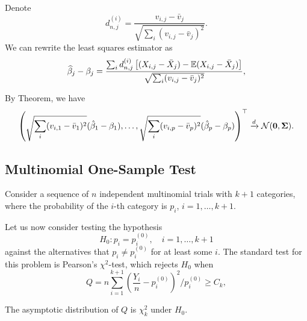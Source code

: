 Denote
\begin{equation*}
	d_{n,j}^{(i)}=\frac{v_{i,j}-\bar{v}_{j}}{\sqrt{\sum_{i}(v_{i,j}-\bar{v}_{j})^{2}}}.
\end{equation*}
We can rewrite the least squares estimator as
\begin{equation*}
	\widehat{\beta}_{j}-\beta_{j}=\frac{\sum_{i}d_{n,j}^{(i)}\left[(X_{i,j}-\bar{X}_{j})-{\mathbb E}(X_{i,j}-\bar{X}_{j})\right]}{\sqrt{\sum_{i}(v_{i,j}-\bar{v}_{j})^{2}}},
\end{equation*}

By Theorem, we have
\begin{equation*}
	\left(\sqrt{\sum_{i}(v_{i,1}-\bar{v}_{1})^{2}}(\hat{\beta}_{1}-\beta_{1}),\ldots,\sqrt{\sum_{i}(v_{i,p}-\bar{v}_{p})^{2}}(\hat{\beta}_{p}-\beta_{p})\right)^{\top}\xrightarrow{d}{\mathcal N}(\mathbf{0},\boldsymbol{\Sigma}).
\end{equation*}

\subsection{Multinomial One-Sample Test}

Consider a sequence of $n$ independent multinomial trials with $k+1$ categories, where the probability of the $i$-th category is $p_{i}$, $i=1,\ldots,k+1$.

Let us now consider testing the hypothesis
\begin{equation*}
	H_{0}:p_i=p_i^{(0)},\quad i=1,\ldots,k+1
\end{equation*}
against the alternatives that $p_{i}\neq p_{i}^{(0)}$ for at least some $i$. The standard test for this problem is Pearson's $\chi^2$-test, which rejects $H_{0}$ when
\begin{equation*}
	Q=n\sum_{i=1}^{k+1}\left(\frac{Y_i}{n}-p_i^{(0)}\right)^2/p_i^{(0)}\geq C_k,
\end{equation*}

The asymptotic distribution of $Q$ is $\chi^{2}_{k}$ under $H_{0}$.

